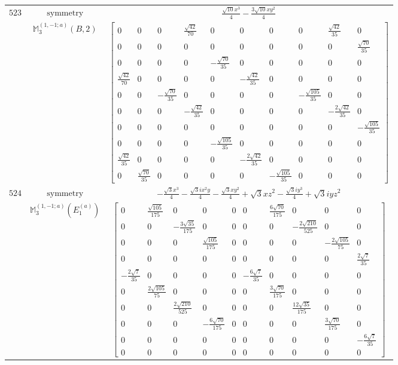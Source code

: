 \documentclass[fleqn,8pt,landscape]{jsarticle}
\begin{document}
\begin{longtable}{ccc}
$ 523 $ & $ \text{symmetry} $ & $ \frac{\sqrt{10} x^{3}}{4} - \frac{3 \sqrt{10} x y^{2}}{4} $ \\
$  $ & $ \mathbb{M}_{3}^{(1,-1;a)}(B,2) $ & $ \begin{bmatrix} 0 & 0 & 0 & \frac{\sqrt{42}}{70} & 0 & 0 & 0 & 0 & \frac{\sqrt{42}}{35} & 0 \\ 0 & 0 & 0 & 0 & 0 & 0 & 0 & 0 & 0 & \frac{\sqrt{70}}{35} \\ 0 & 0 & 0 & 0 & - \frac{\sqrt{70}}{35} & 0 & 0 & 0 & 0 & 0 \\ \frac{\sqrt{42}}{70} & 0 & 0 & 0 & 0 & - \frac{\sqrt{42}}{35} & 0 & 0 & 0 & 0 \\ 0 & 0 & - \frac{\sqrt{70}}{35} & 0 & 0 & 0 & 0 & - \frac{\sqrt{105}}{35} & 0 & 0 \\ 0 & 0 & 0 & - \frac{\sqrt{42}}{35} & 0 & 0 & 0 & 0 & - \frac{2 \sqrt{42}}{35} & 0 \\ 0 & 0 & 0 & 0 & 0 & 0 & 0 & 0 & 0 & - \frac{\sqrt{105}}{35} \\ 0 & 0 & 0 & 0 & - \frac{\sqrt{105}}{35} & 0 & 0 & 0 & 0 & 0 \\ \frac{\sqrt{42}}{35} & 0 & 0 & 0 & 0 & - \frac{2 \sqrt{42}}{35} & 0 & 0 & 0 & 0 \\ 0 & \frac{\sqrt{70}}{35} & 0 & 0 & 0 & 0 & - \frac{\sqrt{105}}{35} & 0 & 0 & 0 \end{bmatrix} $ \\ \hline
$ 524 $ & $ \text{symmetry} $ & $ - \frac{\sqrt{3} x^{3}}{4} - \frac{\sqrt{3} i x^{2} y}{4} - \frac{\sqrt{3} x y^{2}}{4} + \sqrt{3} x z^{2} - \frac{\sqrt{3} i y^{3}}{4} + \sqrt{3} i y z^{2} $ \\
$  $ & $ \mathbb{M}_{3}^{(1,-1;a)}(E_{1}^{(a)}) $ & $ \begin{bmatrix} 0 & \frac{\sqrt{105}}{175} & 0 & 0 & 0 & 0 & \frac{6 \sqrt{70}}{175} & 0 & 0 & 0 \\ 0 & 0 & - \frac{3 \sqrt{35}}{175} & 0 & 0 & 0 & 0 & - \frac{2 \sqrt{210}}{525} & 0 & 0 \\ 0 & 0 & 0 & \frac{\sqrt{105}}{175} & 0 & 0 & 0 & 0 & - \frac{2 \sqrt{105}}{75} & 0 \\ 0 & 0 & 0 & 0 & 0 & 0 & 0 & 0 & 0 & \frac{2 \sqrt{7}}{35} \\ - \frac{2 \sqrt{7}}{35} & 0 & 0 & 0 & 0 & - \frac{6 \sqrt{7}}{35} & 0 & 0 & 0 & 0 \\ 0 & \frac{2 \sqrt{105}}{75} & 0 & 0 & 0 & 0 & \frac{3 \sqrt{70}}{175} & 0 & 0 & 0 \\ 0 & 0 & \frac{2 \sqrt{210}}{525} & 0 & 0 & 0 & 0 & \frac{12 \sqrt{35}}{175} & 0 & 0 \\ 0 & 0 & 0 & - \frac{6 \sqrt{70}}{175} & 0 & 0 & 0 & 0 & \frac{3 \sqrt{70}}{175} & 0 \\ 0 & 0 & 0 & 0 & 0 & 0 & 0 & 0 & 0 & - \frac{6 \sqrt{7}}{35} \\ 0 & 0 & 0 & 0 & 0 & 0 & 0 & 0 & 0 & 0 \end{bmatrix} $ \\ \hline

\end{longtable}
\end{document}
